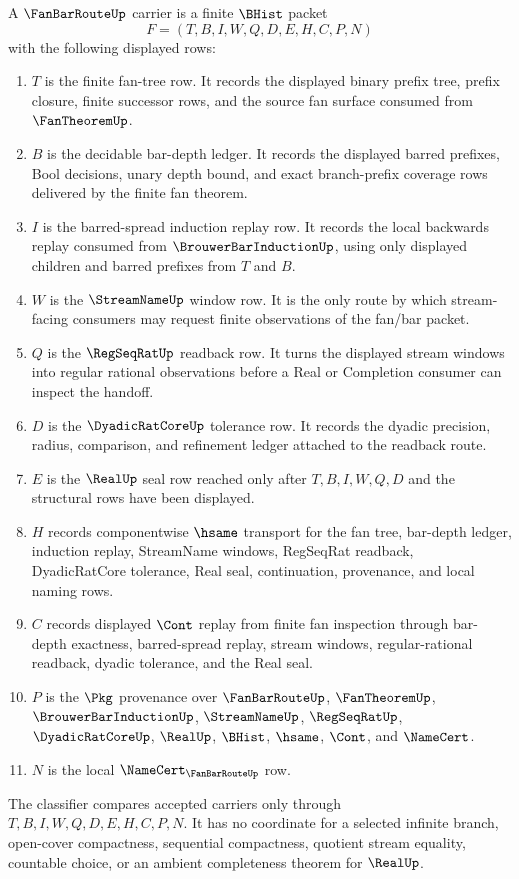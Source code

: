 \begin{definition}
\label{def:fan-bar-route-carrier}
A $\FanBarRouteUp$ carrier is a finite $\BHist$ packet
$$
F=(T,B,I,W,Q,D,E,H,C,P,N)
$$
with the following displayed rows:
\begin{enumerate}
\item $T$ is the finite fan-tree row. It records the displayed binary prefix tree, prefix closure, finite successor rows, and the source fan surface consumed from $\FanTheoremUp$.
\item $B$ is the decidable bar-depth ledger. It records the displayed barred prefixes, Bool decisions, unary depth bound, and exact branch-prefix coverage rows delivered by the finite fan theorem.
\item $I$ is the barred-spread induction replay row. It records the local backwards replay consumed from $\BrouwerBarInductionUp$, using only displayed children and barred prefixes from $T$ and $B$.
\item $W$ is the $\StreamNameUp$ window row. It is the only route by which stream-facing consumers may request finite observations of the fan/bar packet.
\item $Q$ is the $\RegSeqRatUp$ readback row. It turns the displayed stream windows into regular rational observations before a Real or Completion consumer can inspect the handoff.
\item $D$ is the $\DyadicRatCoreUp$ tolerance row. It records the dyadic precision, radius, comparison, and refinement ledger attached to the readback route.
\item $E$ is the $\RealUp$ seal row reached only after $T,B,I,W,Q,D$ and the structural rows have been displayed.
\item $H$ records componentwise $\hsame$ transport for the fan tree, bar-depth ledger, induction replay, StreamName windows, RegSeqRat readback, DyadicRatCore tolerance, Real seal, continuation, provenance, and local naming rows.
\item $C$ records displayed $\Cont$ replay from finite fan inspection through bar-depth exactness, barred-spread replay, stream windows, regular-rational readback, dyadic tolerance, and the Real seal.
\item $P$ is the $\Pkg$ provenance over $\FanBarRouteUp$, $\FanTheoremUp$, $\BrouwerBarInductionUp$, $\StreamNameUp$, $\RegSeqRatUp$, $\DyadicRatCoreUp$, $\RealUp$, $\BHist$, $\hsame$, $\Cont$, and $\NameCert$.
\item $N$ is the local $\NameCert_{\FanBarRouteUp}$ row.
\end{enumerate}
The classifier compares accepted carriers only through $T,B,I,W,Q,D,E,H,C,P,N$. It has no coordinate for a selected infinite branch, open-cover compactness, sequential compactness, quotient stream equality, countable choice, or an ambient completeness theorem for $\RealUp$.
\end{definition}


